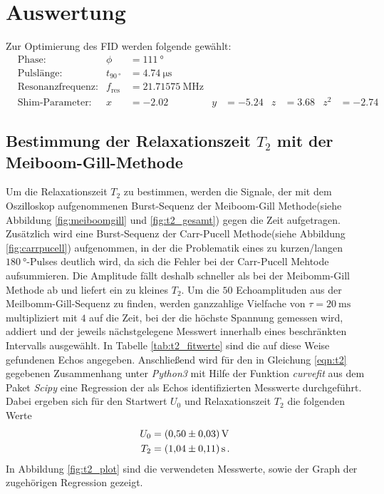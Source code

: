 \newpage
\section{Auswertung}
\label{sec:Auswertung}

Zur Optimierung des FID werden folgende gewählt:
\begin{align}
&\text{Phase:} & \phi&= \SI{111}{\degree}\\
&\text{Pulslänge:} & t_{\SI{90}{\degree}}& =  \SI{4.74}{\micro\second}\\
&\text{Resonanzfrequenz:} & f_{\text{res}}&= \SI{21.71575}{\mega\hertz}\\
&\text{Shim-Parameter:} & x&=\num{-2.02} & y&=\num{-5.24} & z&=\num{3.68} & z^2&=\num{-2.74}
\end{align}

\subsection{Bestimmung der Relaxationszeit $T_{2}$ mit der Meiboom-Gill-Methode}
\label{subsec:T2}
Um die Relaxationszeit $T_{2}$ zu bestimmen, werden die Signale, der mit dem Oszilloskop aufgenommenen
Burst-Sequenz der Meiboom-Gill Methode(siehe Abbildung \ref{fig:meiboomgill} und \ref{fig:t2_gesamt}) gegen die Zeit aufgetragen.
Zusätzlich wird eine Burst-Sequenz der Carr-Pucell Methode(siehe Abbildung \ref{fig:carrpucell}) aufgenommen, in der die
Problematik eines zu kurzen/langen $\SI{180}{\degree}$-Pulses deutlich wird, da
sich die Fehler bei der Carr-Pucell Mehtode aufsummieren.
Die Amplitude fällt deshalb schneller als bei der Meibomm-Gill Methode
ab und liefert ein zu kleines $T_2$.
Um die $50$ Echoamplituden aus der Meilbomm-Gill-Sequenz zu finden, werden ganzzahlige Vielfache von $\tau = \SI{20}{\milli\second}$ multipliziert mit $4$
auf die Zeit, bei der die höchste Spannung gemessen wird, addiert und der jeweils nächstgelegene Messwert innerhalb eines beschränkten Intervalls ausgewählt.
In Tabelle \ref{tab:t2_fitwerte}
sind die auf diese Weise gefundenen Echos angegeben.
Anschließend wird für den in Gleichung \eqref{eqn:t2} gegebenen Zusammenhang unter \textit{Python3} mit Hilfe der Funktion \textit{curvefit} aus
dem Paket \textit{Scipy} eine Regression der als Echos identifizierten Messwerte durchgeführt.\\
Dabei ergeben sich für den Startwert $U_{0}$ und Relaxationszeit $T_{2}$ die folgenden Werte
\begin{align*}
  U_{0} &= \SI{0.50+-0.03}{\volt} \\
  T_{2} &= \SI{ 1.04+-0.11}{\second} \, .
\end{align*}
In Abbildung \ref{fig:t2_plot} sind die verwendeten Messwerte, sowie der Graph der zugehörigen Regression
gezeigt.\\


